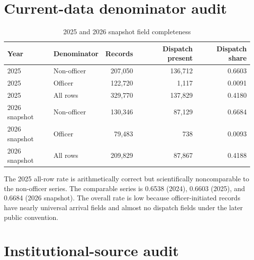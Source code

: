 \documentclass[11pt]{article}
\begin{document}
\section{Current-data denominator audit}

\begin{table}[t]
\centering
\caption{2025 and 2026 snapshot field completeness}
\label{tab:currentsupp}
\begin{tabular}{@{}llrrr@{}}
\toprule
Year & Denominator & Records & Dispatch present & Dispatch share \\
\midrule
2025 & Non-officer & 207,050 & 136,712 & 0.6603 \\
2025 & Officer & 122,720 & 1,117 & 0.0091 \\
2025 & All rows & 329,770 & 137,829 & 0.4180 \\
2026 snapshot & Non-officer & 130,346 & 87,129 & 0.6684 \\
2026 snapshot & Officer & 79,483 & 738 & 0.0093 \\
2026 snapshot & All rows & 209,829 & 87,867 & 0.4188 \\
\bottomrule
\end{tabular}
\end{table}

The 2025 all-row rate is arithmetically correct but scientifically noncomparable to the non-officer series. The comparable series is 0.6538 (2024), 0.6603 (2025), and 0.6684 (2026 snapshot). The overall rate is low because officer-initiated records have nearly universal arrival fields and almost no dispatch fields under the later public convention.

\section{Institutional-source audit}
\end{document}
